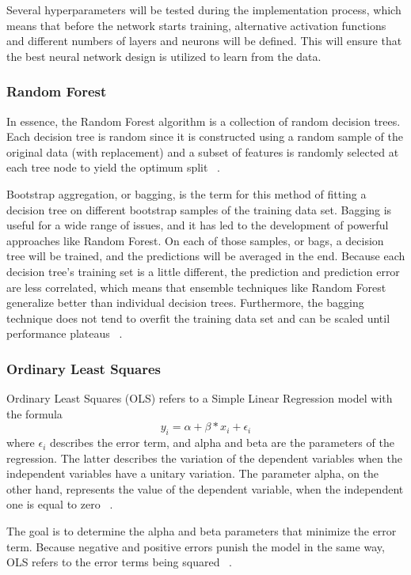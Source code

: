 \documentclass{imc-inf}
\begin{document}
Several hyperparameters will be tested during the implementation process, which means that before the network starts training, alternative activation functions and different numbers of layers and neurons will be defined. This will ensure that the best neural network design is utilized to learn from the data.

\subsubsection{Random Forest}
In essence, the Random Forest algorithm is a collection of random decision trees. Each decision tree is random since it is constructed using a random sample of the original data (with replacement) and a subset of features is randomly selected at each tree node to yield the optimum split ~\cite{rf_intro}.

Bootstrap aggregation, or bagging, is the term for this method of fitting a decision tree on different bootstrap samples of the training data set. Bagging is useful for a wide range of issues, and it has led to the development of powerful approaches like Random Forest. On each of those samples, or bags, a decision tree will be trained, and the predictions will be averaged in the end. Because each decision tree's training set is a little different, the prediction and prediction error are less correlated, which means that ensemble techniques like Random Forest generalize better than individual decision trees. Furthermore, the bagging technique does not tend to overfit the training data set and can be scaled until performance plateaus ~\cite{bagging}.

\subsubsection{Ordinary Least Squares}
Ordinary Least Squares (OLS) refers to a Simple Linear Regression model with the formula 
$$y_{i} = \alpha + \beta * x_{i} + \epsilon_{i}$$
where $\epsilon_{i}$ describes the error term, and alpha and beta are the parameters of the regression. The latter describes the variation of the dependent variables when the independent variables have a unitary variation. The parameter alpha, on the other hand, represents the value of the dependent variable, when the independent one is equal to zero ~\cite{ols_intro}.

The goal is to determine the alpha and beta parameters that minimize the error term. Because negative and positive errors punish the model in the same way, OLS refers to the error terms being squared ~\cite{ols_intro}.
\end{document}
